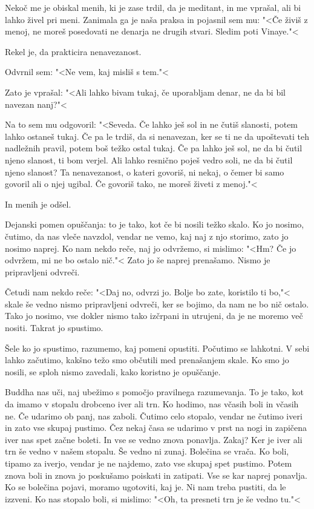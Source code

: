 \clearpage


Nekoč me je obiskal menih, ki je zase trdil, da je meditant, in me vprašal, ali bi lahko živel pri meni. Zanimala ga je naša praksa in pojasnil sem mu: "<Če živiš z menoj, ne moreš posedovati ne denarja ne drugih stvari. Sledim poti Vinaye."<

Rekel je, da prakticira nenavezanost.

Odvrnil sem: "<Ne vem, kaj misliš s tem."<

Zato je vprašal: "<Ali lahko bivam tukaj, če uporabljam denar, ne da bi bil navezan nanj?"<

Na to sem mu odgovoril: "<Seveda. Če lahko ješ sol in ne čutiš slanosti, potem lahko ostaneš tukaj. Če pa le trdiš, da si nenavezan, ker se ti ne da upoštevati teh nadležnih pravil, potem boš težko ostal tukaj. Če pa lahko ješ sol, ne da bi čutil njeno slanost, ti bom verjel. Ali lahko resnično poješ vedro soli, ne da bi čutil njeno slanost? Ta nenavezanost, o kateri govoriš, ni nekaj, o čemer bi samo govoril ali o njej ugibal. Če govoriš tako, ne moreš živeti z menoj."<

In menih je odšel.

\clearpage


Dejanski pomen opuščanja: to je tako, kot če bi nosili težko skalo. Ko jo nosimo, čutimo, da nas vleče navzdol, vendar ne vemo, kaj naj z njo storimo, zato jo nosimo naprej. Ko nam nekdo reče, naj jo odvržemo, si mislimo: "<Hm? Če jo odvržem, mi ne bo ostalo nič."< Zato jo še naprej prenašamo. Nismo je pripravljeni odvreči.

Četudi nam nekdo reče: "<Daj no, odvrzi jo. Bolje bo zate, koristilo ti bo,"< skale še vedno nismo pripravljeni odvreči, ker se bojimo, da nam ne bo nič ostalo. Tako jo nosimo, vse dokler nismo tako izčrpani in utrujeni, da je ne moremo več nositi. Takrat jo spustimo.

Šele ko jo spustimo, razumemo, kaj pomeni opustiti. Počutimo se lahkotni. V sebi lahko začutimo, kakšno težo smo občutili med prenašanjem skale. Ko smo jo nosili, se sploh nismo zavedali, kako koristno je opuščanje.

\clearpage


Buddha nas uči, naj ubežimo s pomočjo pravilnega razumevanja. To je tako, kot da imamo v stopalu drobceno iver ali trn. Ko hodimo, nas včasih boli in včasih ne. Če udarimo ob panj, nas zaboli. Čutimo celo stopalo, vendar ne čutimo iveri in zato vse skupaj pustimo. Čez nekaj časa se udarimo v prst na nogi in zapičena iver nas spet začne boleti. In vse se vedno znova ponavlja. Zakaj? Ker je iver ali trn še vedno v našem stopalu. Še vedno ni zunaj. Bolečina se vrača. Ko boli, tipamo za iverjo, vendar je ne najdemo, zato vse skupaj spet pustimo. Potem znova boli in znova jo poskušamo poiskati in zatipati. Vse se kar naprej ponavlja. Ko se bolečina pojavi, moramo ugotoviti, kaj je. Ni nam treba pustiti, da le izzveni. Ko nas stopalo boli, si mislimo: "<Oh, ta presneti trn je še vedno tu."<

